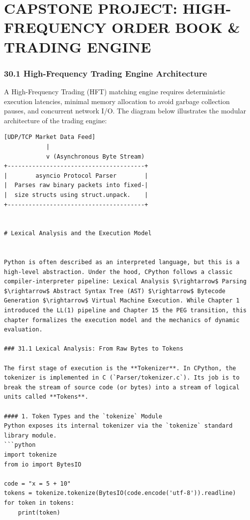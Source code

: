 \hypertarget{capstone-project-high-frequency-order-book-trading-engine}{%
\chapter{CAPSTONE PROJECT: HIGH-FREQUENCY ORDER BOOK \& TRADING
ENGINE}\label{capstone-project-high-frequency-order-book-trading-engine}}

\hypertarget{high-frequency-trading-engine-architecture}{%
\subsection{30.1 High-Frequency Trading Engine
Architecture}\label{high-frequency-trading-engine-architecture}}

A High-Frequency Trading (HFT) matching engine requires deterministic
execution latencies, minimal memory allocation to avoid garbage
collection pauses, and concurrent network I/O. The diagram below
illustrates the modular architecture of the trading engine:

\begin{lstlisting}
[UDP/TCP Market Data Feed]
            |
            v (Asynchronous Byte Stream)
+---------------------------------------+
|        asyncio Protocol Parser        |
|  Parses raw binary packets into fixed-|
|  size structs using struct.unpack.    |
+---------------------------------------+


# Lexical Analysis and the Execution Model


Python is often described as an interpreted language, but this is a high-level abstraction. Under the hood, CPython follows a classic compiler-interpreter pipeline: Lexical Analysis $\rightarrow$ Parsing $\rightarrow$ Abstract Syntax Tree (AST) $\rightarrow$ Bytecode Generation $\rightarrow$ Virtual Machine Execution. While Chapter 1 introduced the LL(1) pipeline and Chapter 15 the PEG transition, this chapter formalizes the execution model and the mechanics of dynamic evaluation.

### 31.1 Lexical Analysis: From Raw Bytes to Tokens

The first stage of execution is the **Tokenizer**. In CPython, the tokenizer is implemented in C (`Parser/tokenizer.c`). Its job is to break the stream of source code (or bytes) into a stream of logical units called **Tokens**.

#### 1. Token Types and the `tokenize` Module
Python exposes its internal tokenizer via the `tokenize` standard library module.
```python
import tokenize
from io import BytesIO

code = "x = 5 + 10"
tokens = tokenize.tokenize(BytesIO(code.encode('utf-8')).readline)
for token in tokens:
    print(token)
\end{lstlisting}


